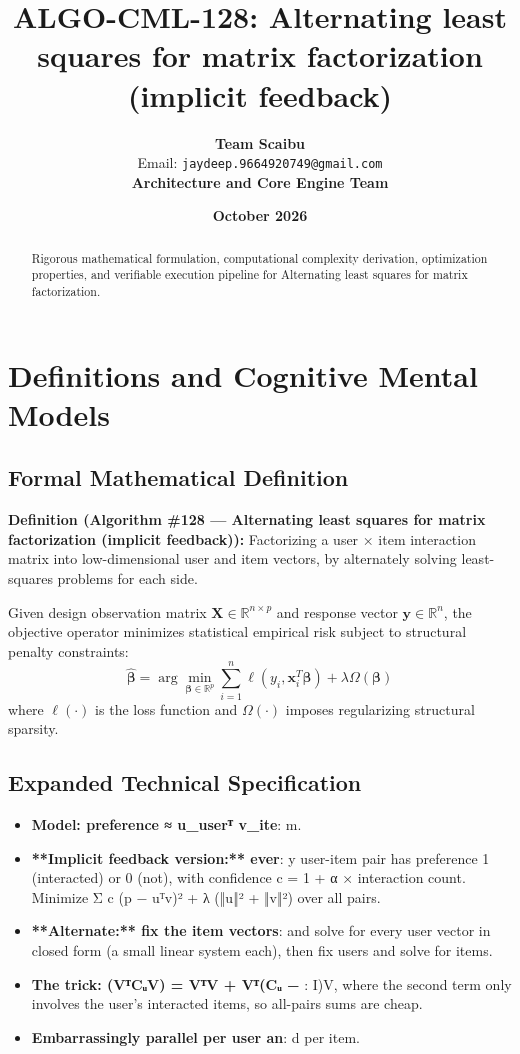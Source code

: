 \documentclass[11pt,a4paper]{article}
\title{\textbf{ALGO-CML-128: Alternating least squares for matrix factorization (implicit feedback)}}
\author{\textbf{Team Scaibu} \\ \small Email: \texttt{jaydeep.9664920749@gmail.com} \\ \small \textbf{Architecture and Core Engine Team}}
\date{\textbf{October 2026}}
\theoremstyle{definition}
\begin{document}
\maketitle

\begin{abstract}
Rigorous mathematical formulation, computational complexity derivation, optimization properties, and verifiable execution pipeline for Alternating least squares for matrix factorization.
\end{abstract}

\section{Definitions and Cognitive Mental Models}

\subsection{Formal Mathematical Definition}
\textbf{Definition (Algorithm \#128 --- Alternating least squares for matrix factorization (implicit feedback)):}
Factorizing a user × item interaction matrix into low-dimensional user and item vectors, by alternately solving least-squares problems for each side.

Given design observation matrix $\mathbf{X} \in \mathbb{R}^{n \times p}$ and response vector $\mathbf{y} \in \mathbb{R}^n$, the objective operator minimizes statistical empirical risk subject to structural penalty constraints:
\begin{equation}
\hat{\boldsymbol{\beta}} = \arg\min_{\boldsymbol{\beta} \in \mathbb{R}^p} \sum_{i=1}^n \ell(y_i, \mathbf{x}_i^T \boldsymbol{\beta}) + \lambda \Omega(\boldsymbol{\beta})
\end{equation}
where $\ell(\cdot)$ is the loss function and $\Omega(\cdot)$ imposes regularizing structural sparsity.

\subsection{Expanded Technical Specification}
\begin{itemize}
\item \textbf{Model: preference ≈ u\_userᵀ v\_ite}: m.
\item \textbf{**Implicit feedback version:** ever}: y user-item pair has preference 1 (interacted) or 0 (not), with confidence c = 1 + α × interaction count. Minimize Σ c (p − uᵀv)² + λ (‖u‖² + ‖v‖²) over all pairs.
\item \textbf{**Alternate:** fix the item vectors}:  and solve for every user vector in closed form (a small linear system each), then fix users and solve for items.
\item \textbf{The trick: (VᵀCᵤV) = VᵀV + Vᵀ(Cᵤ − }: I)V, where the second term only involves the user's interacted items, so all-pairs sums are cheap.
\item \textbf{Embarrassingly parallel per user an}: d per item.
\end{itemize}
\end{document}
